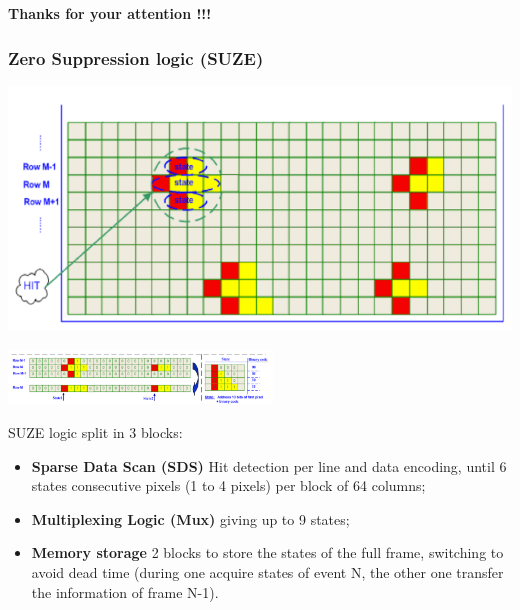 \documentclass{beamer}
\newcommand{\grille}{
    \begin{tikzpicture}[overlay,remember picture]
        \begin{scope}[shift={(current page.south west)}]
            \draw[gray!50] (0,0) grid[step=2mm] (current page.north east);
            \draw[red!50] (0,0) grid[step=1cm] (current page.north east);
            \draw (0.2,1) node {1};
            \draw (0.2,2) node {2};
            \draw (0.2,3) node {3};
            \draw (0.2,4) node {4};
            \draw (0.2,5) node {5};
            \draw (0.2,6) node {6};
            \draw (0.2,7) node {7};
            \draw (0.2,8) node {8};
            \draw (0.2,9) node {9};
            \draw (1,0.5) node {1};
            \draw (2,0.5) node {2};
            \draw (3,0.5) node {3};
            \draw (4,0.5) node {4};
            \draw (5,0.5) node {5};
            \draw (6,0.5) node {6};
            \draw (7,0.5) node {7};
            \draw (8,0.5) node {8};
            \draw (9,0.5) node {9};
            \draw (10,0.5) node {10};
            \draw (11,0.5) node {11};
            \draw (12,0.5) node {12};
        \end{scope}
    \end{tikzpicture}
}
\begin{document}
  \begin{frame}
    \begin{center}
      \huge
      \textbf{Thanks for your attention !!!}
    \end{center}
  \end{frame}

  \appendix
  \setcounter{lastframe}{\insertframenumber}


  \begin{frame}[plain, label=suze]
    \frametitle{Zero Suppression logic (SUZE)}

    \vspace{-0.4cm}
    \begin{center}
        \includegraphics[width = 7 cm]{Pictures/suze_hitDetection.png}

        \includegraphics[width = 7cm]{Pictures/suze_hit2.png}
    \end{center}

    \vspace{-0.3cm}
    \scriptsize

    SUZE logic split in 3 blocks:
    \begin{itemize}
        \item \textbf{Sparse Data Scan (SDS)} Hit detection per line and data encoding, until 6 states consecutive pixels (1 to 4 pixels) per block of 64 columns;
        \item \textbf{Multiplexing Logic (Mux)} giving up to 9 states;
        \item \textbf{Memory storage} 2 blocks to store the states of the full frame, switching to avoid dead time (during one acquire states of event N, the other one transfer the information of frame N-1).
    \end{itemize}

  \end{frame}
\end{document}
